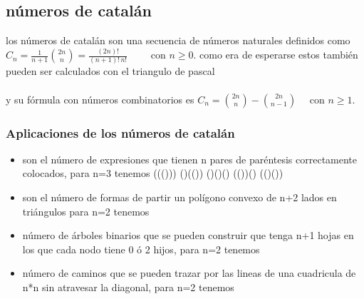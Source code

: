 \subsection{números de catalán}
los números de catalán son una secuencia de números naturales definidos como
\\$C_{n}={\frac {1}{n+1}}{2n \choose n}={\frac {(2n)!}{(n+1)!\,n!}}\qquad {\mbox{ con }}n\geq 0.$
como era de esperarse estos también pueden ser  calculados con el triangulo de pascal
\\
\\y su fórmula con números combinatorios es $C_{n}={2n \choose n}-{2n \choose n-1}\quad {\mbox{ con }}n\geq 1.$
\subsubsection{Aplicaciones de los números de catalán}
\begin{itemize}
  \item son el número de expresiones que tienen n pares de paréntesis correctamente colocados, para n=3 tenemos ((()))	()(())	()()()	(())()	(()())
  \item son el número de formas de  partir un polígono convexo de n+2 lados en triángulos para n=2 tenemos
  \\
  \item número de árboles binarios que se pueden construir que tenga n+1 hojas en los que cada nodo tiene 0 ó 2 hijos, para n=2 tenemos
  \\
  \item número de caminos que se pueden trazar por las lineas de una cuadricula de n*n sin atravesar la diagonal, para n=2 tenemos
  \\
\end{itemize}

